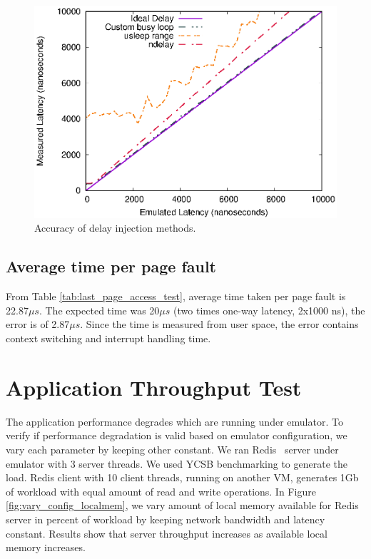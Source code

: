 \begin{figure}[t]
	\centering
	\includegraphics{evaluation/lat_accuracy.eps}
	\caption{Accuracy of delay injection methods.}
	\label{fig:lat_accuracy}
\end{figure}

\subsection{Average time per page fault}
From Table \ref{tab:last_page_access_test}, average time taken per page fault is 22.87${\mu}s$. The expected time was 20${\mu}s$ (two times one-way latency, 2x1000 ns), the error is of 2.87${\mu}s$. Since the time is measured from user space, the error contains context switching and interrupt handling time.


\section{Application Throughput Test}
The application performance degrades which are running under emulator. To verify if performance degradation is valid based on emulator configuration, we vary each parameter by keeping other constant. We ran Redis~\citep{redis} server under emulator with 3 server threads. We used YCSB\cite{ycsb} benchmarking to generate the load. Redis client with 10 client threads, running on another VM, generates 1Gb of workload with equal amount of read and write operations. In Figure \ref{fig:vary_config_localmem}, we vary amount of local memory available for Redis server in percent of workload by keeping network bandwidth and latency constant. Results show that server throughput increases as available local memory increases.

